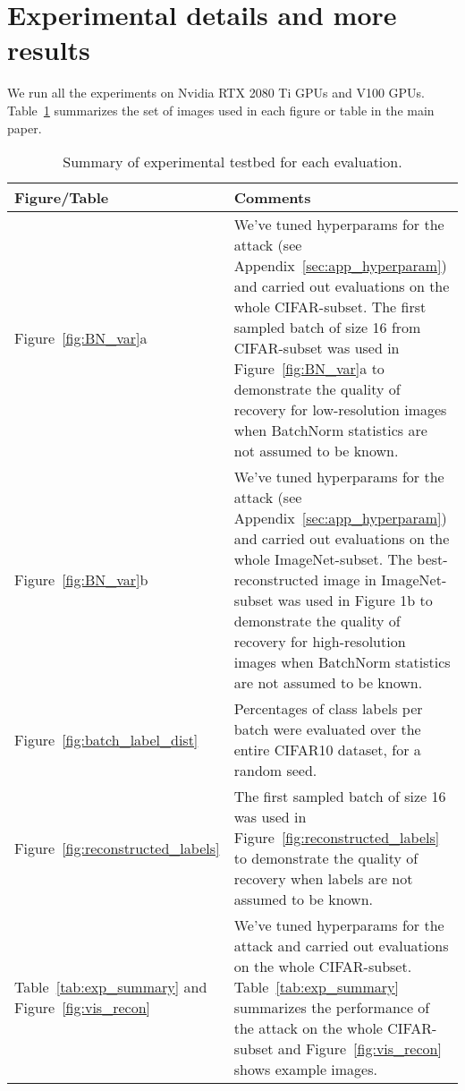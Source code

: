 \appendix

\section{Experimental details and more results}
\label{sec:app_exp}
We run all the experiments on Nvidia RTX 2080 Ti GPUs and V100 GPUs. Table~\ref{tab:app_testbed} summarizes the set of images used in each figure or table in the main paper.  

\captionsetup[table]{font=small}
\begin{table}[H]
    \small
    \centering
    \begin{tabular}{|p{2.5cm}|p{10cm}|}
    \toprule
         {\bf Figure/Table} & {\bf Comments}	\\
    \midrule
        Figure~\ref{fig:BN_var}a & We’ve tuned hyperparams for the attack (see Appendix~\ref{sec:app_hyperparam}) and carried out evaluations on the whole CIFAR-subset. The first sampled batch of size 16 from CIFAR-subset was used in Figure~\ref{fig:BN_var}a to demonstrate the quality of recovery for low-resolution images when BatchNorm statistics are not assumed to be known.  \\
        \midrule
        Figure~\ref{fig:BN_var}b & We’ve tuned hyperparams for the attack (see Appendix~\ref{sec:app_hyperparam}) and carried out evaluations on the whole ImageNet-subset. The best-reconstructed image in ImageNet-subset was used in Figure 1b to demonstrate the quality of recovery for high-resolution images when BatchNorm statistics are not assumed to be known.\\
        \midrule
        Figure~\ref{fig:batch_label_dist} & Percentages of class labels per batch were evaluated over the entire CIFAR10 dataset, for a random seed.	\\
        \midrule
        Figure~\ref{fig:reconstructed_labels} & The first sampled batch of size 16 was used in Figure~\ref{fig:reconstructed_labels} to demonstrate the quality of recovery when labels are not assumed to be known.	\\
        \midrule
        Table~\ref{tab:exp_summary} and Figure~\ref{fig:vis_recon} & We’ve tuned hyperparams for the attack and carried out evaluations on the whole CIFAR-subset. Table~\ref{tab:exp_summary} summarizes the performance of the attack on the whole CIFAR-subset and  Figure~\ref{fig:vis_recon} shows example images.\\
    \bottomrule
    \end{tabular}
    \caption{Summary of experimental testbed for each evaluation.}
    \label{tab:app_testbed}
\end{table}


